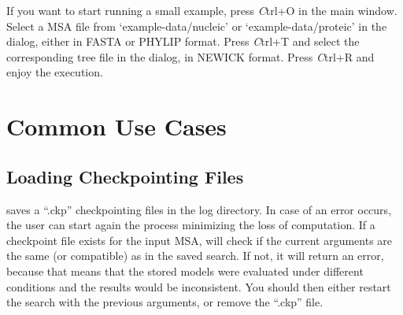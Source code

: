 \documentclass[10pt,twoside,a4paper]{article}
\begin{document}
If you want to start running a small example, press {\emph Ctrl+O} in the main window.
Select a MSA file from `example-data/nucleic' or `example-data/proteic' in the dialog, either in FASTA or PHYLIP format.
Press {\emph Ctrl+T} and select the corresponding tree file in the dialog, in NEWICK format.
Press {\emph Ctrl+R} and enjoy the execution.





\section{Common Use Cases}

\subsection{Loading Checkpointing Files}
\label{sec:ckp}

\modeltest saves a ``.ckp'' checkpointing files in the log directory. In case of an error occurs,
the user can start again the process minimizing the loss of computation.
If a checkpoint file exists for the input MSA, \modeltest will check if the current arguments
are the same (or compatible) as in the saved search.
If not, it will return an error, because that means that the stored models were evaluated under
different conditions and the results would be inconsistent.
You should then either restart the search with the previous arguments,
or remove the ``.ckp'' file.


%



%
%
%
%
%

\end{document}
